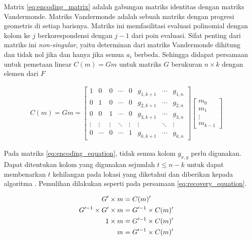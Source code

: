 Matrix \ref{eq:encoding_matrix} adalah gabungan matriks identitas dengan matriks Vandermonde. Matriks Vandermonde adalah sebuah matriks dengan progresi geometris di setiap barisnya. Matriks ini memfasilitasi evaluasi polinomial dengan kolom ke $j$ berkorespondensi dengan $j - 1$ dari poin evaluasi. Sifat penting dari matriks ini \textit{non-singular}, yaitu determinan dari matriks Vandermonde dihitung dan tidak nol jika dan hanya jika semua $a_i$ berbeda. Sehingga didapat persamaan untuk pemetaan linear $C(m) = Gm$ untuk matriks $G$ berukuran ${n} \times {k}$ dengan elemen dari $F$

\begin{align}
    C(m) = Gm = 
    \begin{bmatrix}
        1 & 0 & 0 & \cdots & 0 & g_{1,k+1} & \cdots & g_{1,n} \\
        0 & 1 & 0 & \cdots & 0 & g_{2,k+1} & \cdots & g_{2,n} \\
        0 & 0 & 1 & \cdots & 0 & g_{3,k+1} & \cdots & g_{3,n} \\
        \vdots & \vdots & \vdots & \ddots & \vdots & \vdots & \ddots & \vdots \\
        0 & \cdots & 0 & \cdots & 1 & g_{k,k+1} & \cdots & g_{k,n}
    \end{bmatrix}
    \begin{bmatrix}
        m_0 \\
        m_1 \\
        \vdots \\
        m_{k-1}
    \end{bmatrix}
    \label{eq:encoding_equation}
\end{align}

Pada matriks \ref{eq:encoding_equation}, tidak semua kolom $g_{x,y}$ perlu digunakan. Dapat ditentukan kolom yang digunakan sejumlah $t \le n - k$ untuk dapat membenarkan $t$ kehilangan pada lokasi yang diketahui dan diberikan kepada algoritma \parencite{riley2001introduction}. Pemulihan dilakukan seperti pada persamaan \ref{eq:recovery_equation}.

\begin{align}
    G' \times m &= C(m)' \notag \\
    G'^{-1} \times G' \times m &= G'^{-1} \times C(m)' \notag \\
    1 \times m &= G'^{-1} \times C(m)' \notag \\
    m &= G'^{-1} \times C(m)'
    \label{eq:recovery_equation}
\end{align}

